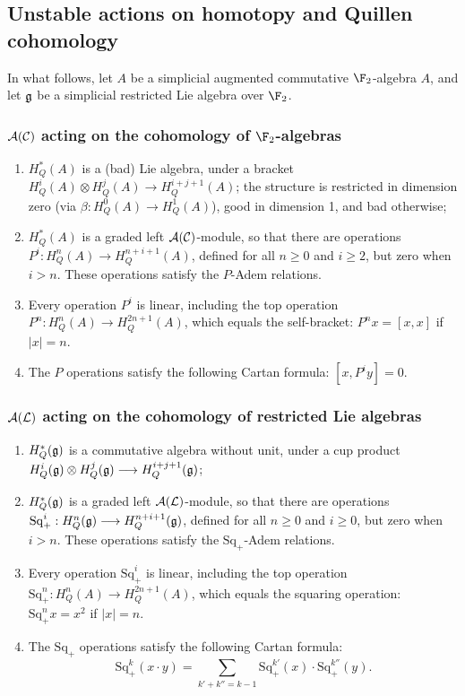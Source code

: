 \documentclass[11pt]{article}
\newcommand{\SqShift}{\Sq_{+}}
\newcommand{\Sq}{\mathrm{Sq}}
\newcommand{\LieSteen}{\calA(\calL)}
\newcommand{\CommSteen}{\calA(\calC)}
\begin{document}
\begin{SteenrodAlgebrasAndTheirKoszulDuals}
\subsection{Unstable actions on homotopy and Quillen cohomology}
In what follows, let $A$ be a simplicial augmented commutative $\F_2$-algebra $A$, and let $\mathfrak{g}$ be a simplicial restricted Lie algebra over $\F_2$.

\subsubsection{$\CommSteen$ acting on the cohomology of $\F_2$-algebras}
\begin{enumerate}\squishlist
\setlength{\parindent}{.25in}
\item $H^*_Q(A)$ is a (bad) Lie algebra, under a bracket $H^i_Q(A)\otimes H^j_Q(A)\to H^{i+j+1}_Q(A)$; the structure is restricted in dimension zero (via $\beta:H^0_Q(A)\to H^1_Q(A)$), good in dimension 1, and bad otherwise;
\item $H^*_Q(A)$ is a graded left $\CommSteen$-module, so that there are operations $P^i:H^n_Q(A)\to H^{n+i+1}_Q(A)$, defined for all $n\geq0$ and $i\geq2$, but zero when $i>n$. These operations satisfy the $P$-Adem relations.
\item Every operation $P^i$ is linear, including the top operation $P^n:H^n_Q(A)\to H^{2n+1}_Q(A)$, which equals the self-bracket:  $P^nx=[x,x]$ if $|x|=n$.
\item The $P$ operations satisfy the following Cartan formula:
$[x,P^iy]=0$.
\end{enumerate}

\subsubsection{$\LieSteen$ acting on the cohomology of restricted Lie algebras}
\begin{enumerate}\squishlist
\setlength{\parindent}{.25in}
\item $H^*_Q(\mathfrak{g})$ is a commutative algebra without unit, under a cup product $H^i_Q(\mathfrak{g})\otimes H^j_Q(\mathfrak{g})\longrightarrow H^{i+j+1}_Q(\mathfrak{g})$;
\item $H^*_Q(\mathfrak{g})$ is a graded left $\LieSteen$-module, so that there are operations $\SqShift^i:H^n_Q(\frakg)\to H^{n+i+1}_Q(\frakg)$, defined for all $n\geq0$ and $i\geq0$, but zero when $i>n$. These operations satisfy the $\SqShift$-Adem relations.
\item Every operation $\SqShift^i$ is linear, including the top operation $\SqShift^n:H^n_Q(A)\to H^{2n+1}_Q(A)$, which equals the squaring operation:  $\SqShift^nx=x^2$ if $|x|=n$.
\item The $\SqShift$ operations satisfy the following Cartan formula:
\[\SqShift^k(x\cdot y)=\sum_{k'+k''=k-1}\SqShift^{k'}(x)\cdot \SqShift^{k''}(y).\]
\end{enumerate}


\end{SteenrodAlgebrasAndTheirKoszulDuals}
\end{document}

